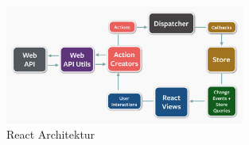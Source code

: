 \begin{figure}[!tbp]
\begin{minipage}[b]{0.8\textwidth}
 	\end{minipage}
 	\hfill
 	\begin{minipage}[b]{0.7\textwidth}
 		\centering
		\includegraphics[width=0.7\textwidth]{images/react}
		\caption{React Architektur \cite{MELD.CH3-web-app.react}}
		\label{fig:reactarch}
 	\end{minipage}
\end{figure}

